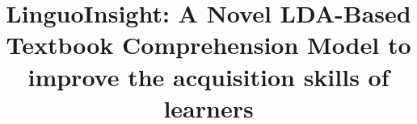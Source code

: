 \documentclass[sn-mathphys,Numbered]{sn-jnl}%
\theoremstyle{thmstyleone}%
\theoremstyle{thmstyletwo}%
\theoremstyle{thmstylethree}%
\begin{document}
\title{LinguoInsight: A Novel LDA-Based Textbook Comprehension Model to improve the acquisition skills of learners}




%


\end{document}
